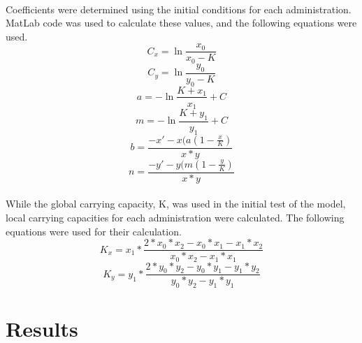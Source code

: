 \documentclass{article}
\begin{document}
		\paragraph{}
		Coefficients were determined using the initial conditions for each administration. MatLab code was used to calculate these values, and the following equations were used. 
		\begin{equation}
		C_{x} = \ln{\frac{x_{0}}{x_{0}-K}}
		\end{equation}
		\begin{equation}
		C_{y} = \ln{\frac{y_{0}}{y_{0}-K}}
		\end{equation}
		\begin{equation}
		a = -\ln{\frac{K+x_{1}}{x_{1}}+C}
		\end{equation}
		\begin{equation}
		m = -\ln{\frac{K+y_{1}}{y_{1}}+C}
		\end{equation}
		\begin{equation}
		b = \frac{-x'-x(a(1-\frac{x}{K})}{x*y}
		\end{equation}
		\begin{equation}
		n = \frac{-y'-y(m(1-\frac{y}{K})}{x*y}
		\end{equation}
		\paragraph{}
		While the global carrying capacity, K, was used in the initial test of the model, local carrying capacities for each administration were calculated. The following equations were used for their calculation.
		\begin{equation}
		K_{x} = x_{1} * \frac{2*x_{0}*x_{2}-x_{0}*x_{1}-x_{1}*x_{2}}{x_{0}*x_{2}-x_{1}*x_{1}}
		\end{equation}	
		\begin{equation}
		K_{y} = y_{1} * \frac{2*y_{0}*y_{2}-y_{0}*y_{1}-y_{1}*y_{2}}{y_{0}*y_{2}-y_{1}*y_{1}}
		\end{equation}	

	\section{Results}
\end{document}
